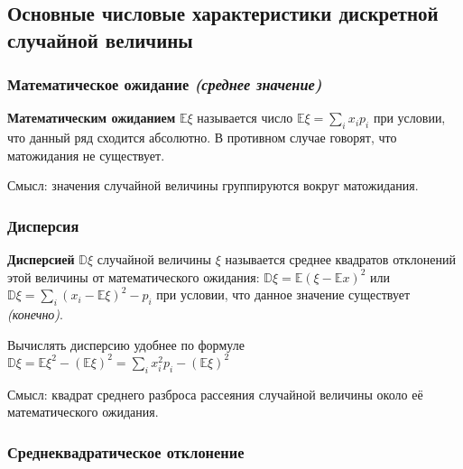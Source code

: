 \subsection{Основные числовые характеристики дискретной случайной величины}

\subsubsection{Математическое ожидание \textit{(среднее значение)}}

\begin{definition}
    \textbf{Математическим ожиданием} \(\mathbb{E}\xi\) называется число \(\mathbb{E}\xi = \sum_i x_ip_i\) при условии, что данный ряд сходится абсолютно. В противном случае говорят, что матожидания не существует.
\end{definition}

\begin{remark}
    Смысл: значения случайной величины группируются вокруг матожидания.
\end{remark}

\subsubsection{Дисперсия}

\begin{definition}
    \textbf{Дисперсией} \(\mathbb{D}\xi\) случайной величины \(\xi\) называется среднее квадратов отклонений этой величины от математического ожидания: \(\mathbb{D}\xi = \mathbb{E}(\xi - \mathbb{E}x)^2\) или \(\mathbb{D}\xi = \sum_i (x_i - \mathbb{E}\xi)^2 - p_i\) при условии, что данное значение существует \textit{(конечно)}.
\end{definition}

\begin{remark}
    Вычислять дисперсию удобнее по формуле \(\mathbb{D}\xi = \mathbb{E}\xi^2 - (\mathbb{E}\xi)^2 = \sum_i x_i^2 p_i - (\mathbb{E}\xi)^2\)
\end{remark}

\begin{remark}
    Смысл: квадрат среднего разброса рассеяния случайной величины около её математического ожидания.
\end{remark}

\subsubsection{Среднеквадратическое отклонение}

